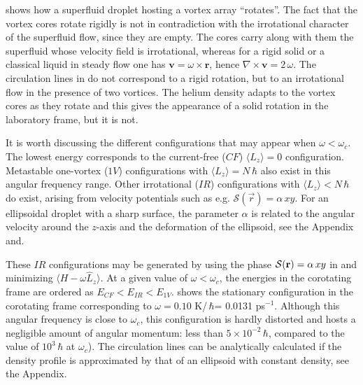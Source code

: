  shows how a superfluid droplet 
hosting a vortex array ``rotates''. The fact that the vortex 
cores rotate rigidly is not in 
contradiction with the irrotational character 
of the superfluid flow, since they are empty.  The cores carry 
along with them the superfluid whose velocity field  is irrotational,
whereas for a rigid solid or a classical liquid in steady flow 
 one has $\mathbf{v} = \omega \times \mathbf{r}$,  hence $\nabla \times \mathbf{v} = 2\, \omega$. 
The circulation lines in  do not correspond 
to a rigid rotation, but to  an irrotational flow in the presence of two vortices. 
The helium density adapts to the vortex cores as they 
rotate and this gives the appearance of a solid 
rotation in the laboratory frame, but it is not. 

It is worth discussing the different  configurations 
that may appear when $\omega < \omega_c$. The lowest energy  
corresponds to the current-free ($CF$) $\langle L_z \rangle =0$ configuration. 
Metastable one-vortex ($1V$) configurations  with 
$\langle L_z \rangle  =N \, \hbar$ also exist in this 
angular frequency range\citep{Anc14,Anc15}. Other irrotational ($IR$) configurations
with $\langle L_z \rangle   < N \, \hbar$ do exist, arising  
from  velocity potentials  such as e.g. 
$\mathcal{S}(\vec{r})=\alpha\,xy$. For an  ellipsoidal droplet with a sharp 
surface, the parameter $\alpha$ is related to the 
angular velocity around the $z$-axis and the deformation 
of the ellipsoid, see the Appendix and. 

These $IR$ configurations may be generated by using  
the phase ${\cal S}(\mathbf{r}) = \alpha \,xy$ in  
 and minimizing $\langle H - \omega \hat{L}_z \rangle$. 
At a given value of $\omega < \omega_c$, the energies in the 
corotating frame  are ordered as $E_{CF} < E_{IR} < E_{1V}$.
 shows the stationary configuration in the 
corotating frame corresponding to  $\omega= 0.10$ K/\,$\hbar$= 0.0131 ps$^{-1}$.
Although this angular frequency is close to  $\omega_c$,
this configuration is hardly distorted and hosts a negligible amount
of angular momentum: less than $5\times 10^{-2}  \, \hbar$,  compared to the value  of $10^3 \,  \hbar$ at $\omega_c$). The circulation lines 
can be analytically calculated if the density 
profile is approximated by that of an ellipsoid with constant density, see the Appendix. 
 
